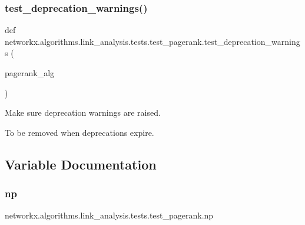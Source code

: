 \subsubsection{\texorpdfstring{test\+\_\+deprecation\+\_\+warnings()}{test\_deprecation\_warnings()}}
{\footnotesize\ttfamily def networkx.\+algorithms.\+link\+\_\+analysis.\+tests.\+test\+\_\+pagerank.\+test\+\_\+deprecation\+\_\+warnings (\begin{DoxyParamCaption}\item[{}]{pagerank\+\_\+alg }\end{DoxyParamCaption})}

\begin{DoxyVerb}Make sure deprecation warnings are raised.

To be removed when deprecations expire.
\end{DoxyVerb}
 

\subsection{Variable Documentation}
\mbox{\label{namespacenetworkx_1_1algorithms_1_1link__analysis_1_1tests_1_1test__pagerank_a8f4b01a89a8ab7dc209dcdb6c83e6142}} 
\subsubsection{\texorpdfstring{np}{np}}
{\footnotesize\ttfamily networkx.\+algorithms.\+link\+\_\+analysis.\+tests.\+test\+\_\+pagerank.\+np}

